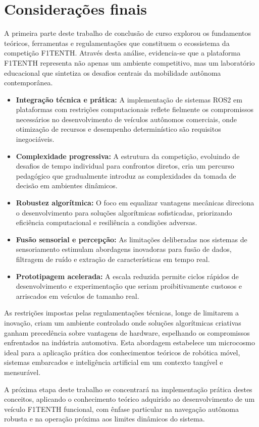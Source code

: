 \chapter{Considerações finais}

A primeira parte deste trabalho de conclusão de curso explorou os fundamentos
teóricos, ferramentas e regulamentações que constituem o ecossistema da
competição F1TENTH. Através desta análise, evidencia-se que a plataforma
F1TENTH representa não apenas um ambiente competitivo, mas um laboratório
educacional que sintetiza os desafios centrais da mobilidade autônoma
contemporânea.

\begin{itemize}
    \item \textbf{Integração técnica e prática:} A implementação de sistemas ROS2 em plataformas com restrições computacionais reflete fielmente os compromissos necessários no desenvolvimento de veículos autônomos comerciais, onde otimização de recursos e desempenho determinístico são requisitos inegociáveis.

    \item \textbf{Complexidade progressiva:} A estrutura da competição, evoluindo de desafios de tempo individual para confrontos diretos, cria um percurso pedagógico que gradualmente introduz as complexidades da tomada de decisão em ambientes dinâmicos.

    \item \textbf{Robustez algorítmica:} O foco em equalizar vantagens mecânicas direciona o desenvolvimento para soluções algorítmicas sofisticadas, priorizando eficiência computacional e resiliência a condições adversas.

    \item \textbf{Fusão sensorial e percepção:} As limitações deliberadas nos sistemas de sensoriamento estimulam abordagens inovadoras para fusão de dados, filtragem de ruído e extração de características em tempo real.

    \item \textbf{Prototipagem acelerada:} A escala reduzida permite ciclos rápidos de desenvolvimento e experimentação que seriam proibitivamente custosos e arriscados em veículos de tamanho real.
\end{itemize}

As restrições impostas pelas regulamentações técnicas, longe de limitarem a
inovação, criam um ambiente controlado onde soluções algorítmicas criativas
ganham precedência sobre vantagens de hardware, espelhando os compromissos
enfrentados na indústria automotiva. Esta abordagem estabelece um microcosmo
ideal para a aplicação prática dos conhecimentos teóricos de robótica móvel,
sistemas embarcados e inteligência artificial em um contexto tangível e
mensurável.

A próxima etapa deste trabalho se concentrará na implementação prática destes
conceitos, aplicando o conhecimento teórico adquirido ao desenvolvimento de um
veículo F1TENTH funcional, com ênfase particular na navegação autônoma robusta
e na operação próxima aos limites dinâmicos do sistema.